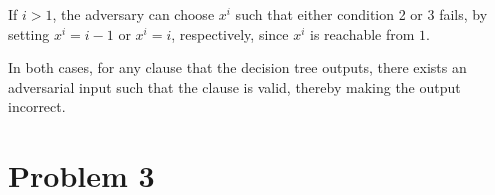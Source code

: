 \documentclass{article}
\begin{document}
If $i > 1$, the adversary can choose $x^i$ such that either condition 2 or
3 fails, by setting $x^i = i - 1$ or $x^i = i$, respectively, since $x^i$ is
reachable from $1$. 

In both cases, for any clause that the decision tree outputs, there exists an
adversarial input such that the clause is valid, thereby making the output
incorrect.

\section*{Problem 3}
\end{document}
